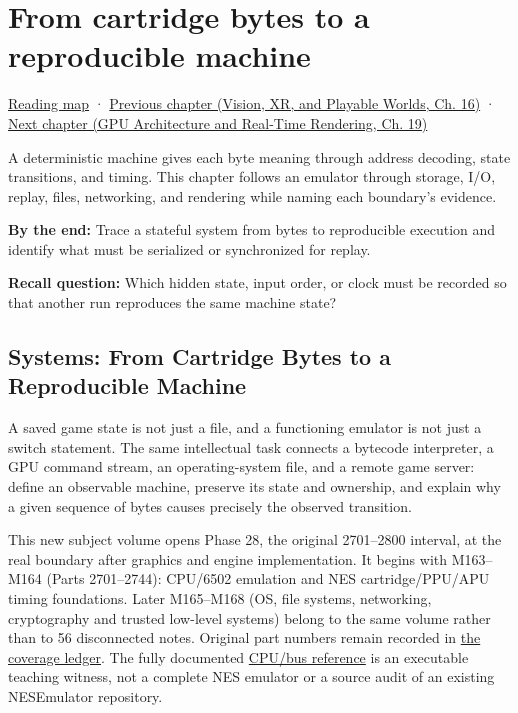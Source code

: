 \chapter{From cartridge bytes to a reproducible machine}\label{06-engine-ii-ch042-from-cartridge-bytes-to-a-reproducible-machine}\hypertarget{06-engine-ii-ch042}{}\label{stagechapter:06-engine-ii-ch042}

\hypertarget{06-engine-ii-ch042-from-cartridge-bytes-to-a-reproducible-machine}{}

\hyperref[volume-reading-map]{Reading map} · \href{../07-Vision-XR-and-Playable-Worlds/main.pdf\#nameddest=06-engine-ii-ch041-evidence-tools-and-revisable-design}{Previous chapter (Vision, XR, and Playable Worlds, Ch. 16)} · \href{../06-GPU-Architecture-and-Real-Time-Rendering/main.pdf\#nameddest=06-engine-ii-ch043-compiling-renderer-intent-into-backend-work}{Next chapter (GPU Architecture and Real-Time Rendering, Ch. 19)}

A deterministic machine gives each byte meaning through address decoding, state transitions, and timing. This chapter follows an emulator through storage, I/O, replay, files, networking, and rendering while naming each boundary's evidence.

\textbf{By the end:} Trace a stateful system from bytes to reproducible execution and identify what must be serialized or synchronized for replay.

\textbf{Recall question:} Which hidden state, input order, or clock must be recorded so that another run reproduces the same machine state?

\section{Systems: From Cartridge Bytes to a Reproducible Machine}\label{06-engine-ii-ch042-systems-from-cartridge-bytes-to-a-reproducible-machine}

\hypertarget{06-engine-ii-ch042-systems-from-cartridge-bytes-to-a-reproducible-machine}{}

A saved game state is not just a file, and a functioning emulator is not just a switch statement. The same intellectual task connects a bytecode interpreter, a GPU command stream, an operating-system file, and a remote game server: define an observable machine, preserve its state and ownership, and explain why a given sequence of bytes causes precisely the observed transition.

This new subject volume opens Phase 28, the original 2701--2800 interval, at the real boundary after graphics and engine implementation. It begins with M163--M164 (Parts 2701--2744): CPU/6502 emulation and NES cartridge/PPU/APU timing foundations. Later M165--M168 (OS, file systems, networking, cryptography and trusted low-level systems) belong to the same volume rather than to 56 disconnected notes. Original part numbers remain recorded in \hyperref[appendix-fd090d982a15-phase-28-m163m168-parts-27012800-deterministic-and-trusted-low-level-systems]{the coverage ledger}. The fully documented \hyperref[source-file-552a9e2296dc984412c8f06d]{CPU/bus reference} is an executable teaching witness, not a complete NES emulator or a source audit of an existing NESEmulator repository.

